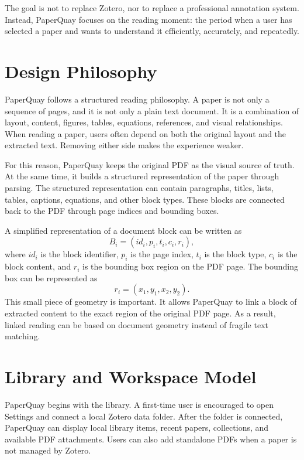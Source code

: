 ﻿\documentclass[11pt,a4paper]{article}
\begin{document}
The goal is not to replace Zotero, nor to replace a professional annotation system. Instead, PaperQuay focuses on the reading moment: the period when a user has selected a paper and wants to understand it efficiently, accurately, and repeatedly.

\section{Design Philosophy}

PaperQuay follows a structured reading philosophy. A paper is not only a sequence of pages, and it is not only a plain text document. It is a combination of layout, content, figures, tables, equations, references, and visual relationships. When reading a paper, users often depend on both the original layout and the extracted text. Removing either side makes the experience weaker.

For this reason, PaperQuay keeps the original PDF as the visual source of truth. At the same time, it builds a structured representation of the paper through parsing. The structured representation can contain paragraphs, titles, lists, tables, captions, equations, and other block types. These blocks are connected back to the PDF through page indices and bounding boxes.

A simplified representation of a document block can be written as
\begin{equation}
B_i = (id_i, p_i, t_i, c_i, r_i),
\end{equation}
where $id_i$ is the block identifier, $p_i$ is the page index, $t_i$ is the block type, $c_i$ is the block content, and $r_i$ is the bounding box region on the PDF page. The bounding box can be represented as
\begin{equation}
r_i = (x_1, y_1, x_2, y_2).
\end{equation}
This small piece of geometry is important. It allows PaperQuay to link a block of extracted content to the exact region of the original PDF page. As a result, linked reading can be based on document geometry instead of fragile text matching.

\section{Library and Workspace Model}

PaperQuay begins with the library. A first-time user is encouraged to open Settings and connect a local Zotero data folder. After the folder is connected, PaperQuay can display local library items, recent papers, collections, and available PDF attachments. Users can also add standalone PDFs when a paper is not managed by Zotero.
\end{document}
